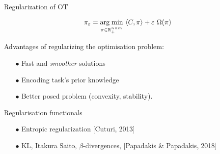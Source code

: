 \documentclass[pdf,aspectratio=169,10pt]{beamer}
\begin{document}
\begin{frame}{Regularization of OT}
\begin{block}{}
$$\pi_{\varepsilon} = \argmin_{\pi\in\R^{n\times m}_+} \ \langle C,\pi\rangle + \varepsilon\ \Omega(\pi)$$
\end{block}

\vspace{0.2cm}Advantages of regularizing the optimisation problem:
\begin{itemize}
\item[$\bullet$] Fast and \emph{smoother} solutions
\item[$\bullet$] Encoding task's prior knowledge
\item[$\bullet$] Better posed problem (convexity, stability).
\end{itemize}
\vspace{1em}

Regularisation functionals
\begin{itemize}
\item[$\bullet$] Entropic regularization [Cuturi, 2013]
\item[$\bullet$] KL, Itakura Saito, $\beta$-divergences, [Papadakis \& Papadakis, 2018]
\end{itemize}

\end{frame}
\end{document}
